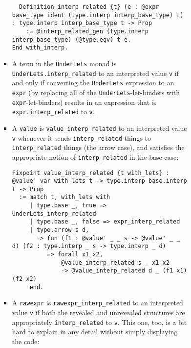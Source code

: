 \begin{itemize}
\begin{itemize}
\begin{itemize}
\begin{itemize}
\begin{itemize}
\begin{itemize}
\begin{verbatim}
  Definition interp_related {t} (e : @expr base_type ident (type.interp interp_base_type) t) : type.interp interp_base_type t -> Prop
    := @interp_related_gen (type.interp interp_base_type) (@type.eqv) t e.
End with_interp.
\end{verbatim}
          \item
            A term in the \texttt{UnderLets} monad is
            \texttt{UnderLets.interp\_related} to an interpreted value
            \texttt{v} if and only if converting the \texttt{UnderLets}
            expression to an \texttt{expr} (by replacing all of the
            \texttt{UnderLets}-let-binders with
            \texttt{expr}-let-binders) results in an expression that is
            \texttt{expr.interp\_related} to \texttt{v}.
          \item
            A \texttt{value} is \texttt{value\_interp\_related} to an
            interpreted value \texttt{v} whenever it sends
            \texttt{interp\_related} things to \texttt{interp\_related}
            things (the arrow case), and satisfies the appropriate
            notion of \texttt{interp\_related} in the base case:

\begin{verbatim}
Fixpoint value_interp_related {t with_lets} : @value' var with_lets t -> type.interp base.interp t -> Prop
  := match t, with_lets with
     | type.base _, true => UnderLets_interp_related
     | type.base _, false => expr_interp_related
     | type.arrow s d, _
       => fun (f1 : @value' _ _ s -> @value' _ _ d) (f2 : type.interp _ s -> type.interp _ d)
          => forall x1 x2,
              @value_interp_related s _ x1 x2
              -> @value_interp_related d _ (f1 x1) (f2 x2)
     end.
\end{verbatim}
          \item
            A \texttt{rawexpr} is \texttt{rawexpr\_interp\_related} to
            an interpreted value \texttt{v} if both the revealed and
            unrevealed structures are appropriately
            \texttt{interp\_related} to \texttt{v}. This one, too, is a
            bit hard to explain in any detail without simply displaying
            the code:


\end{itemize}
\end{itemize}
\end{itemize}
\end{itemize}
\end{itemize}
\end{itemize}
